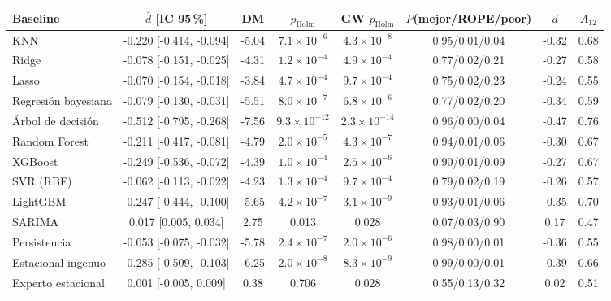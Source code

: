 \begin{tabular}{lccccccc}
\toprule
Baseline & $\bar d$ [IC 95\,\%] & DM & $p_{\mathrm{Holm}}$ & GW $p_{\mathrm{Holm}}$ & $P$(mejor/ROPE/peor) & $d$ & $A_{12}$ \\
\midrule
KNN & -0.220 [-0.414, -0.094] & -5.04 & $7.1\times10^{-6}$ & $4.3\times10^{-8}$ & 0.95/0.01/0.04 & -0.32 & 0.68 \\
Ridge & -0.078 [-0.151, -0.025] & -4.31 & $1.2\times10^{-4}$ & $4.9\times10^{-4}$ & 0.77/0.02/0.21 & -0.27 & 0.58 \\
Lasso & -0.070 [-0.154, -0.018] & -3.84 & $4.7\times10^{-4}$ & $9.7\times10^{-4}$ & 0.75/0.02/0.23 & -0.24 & 0.55 \\
Regresión bayesiana & -0.079 [-0.130, -0.031] & -5.51 & $8.0\times10^{-7}$ & $6.8\times10^{-6}$ & 0.77/0.02/0.20 & -0.34 & 0.59 \\
Árbol de decisión & -0.512 [-0.795, -0.268] & -7.56 & $9.3\times10^{-12}$ & $2.3\times10^{-14}$ & 0.96/0.00/0.04 & -0.47 & 0.76 \\
Random Forest & -0.211 [-0.417, -0.081] & -4.79 & $2.0\times10^{-5}$ & $4.3\times10^{-7}$ & 0.94/0.01/0.06 & -0.30 & 0.67 \\
XGBoost & -0.249 [-0.536, -0.072] & -4.39 & $1.0\times10^{-4}$ & $2.5\times10^{-6}$ & 0.90/0.01/0.09 & -0.27 & 0.67 \\
SVR (RBF) & -0.062 [-0.113, -0.022] & -4.23 & $1.3\times10^{-4}$ & $9.7\times10^{-4}$ & 0.79/0.02/0.19 & -0.26 & 0.57 \\
LightGBM & -0.247 [-0.444, -0.100] & -5.65 & $4.2\times10^{-7}$ & $3.1\times10^{-9}$ & 0.93/0.01/0.06 & -0.35 & 0.70 \\
SARIMA & 0.017 [0.005, 0.034] & 2.75 & 0.013 & 0.028 & 0.07/0.03/0.90 & 0.17 & 0.47 \\
Persistencia & -0.053 [-0.075, -0.032] & -5.78 & $2.4\times10^{-7}$ & $2.0\times10^{-6}$ & 0.98/0.00/0.01 & -0.36 & 0.55 \\
Estacional ingenuo & -0.285 [-0.509, -0.103] & -6.25 & $2.0\times10^{-8}$ & $8.3\times10^{-9}$ & 0.99/0.00/0.01 & -0.39 & 0.66 \\
Experto estacional & 0.001 [-0.005, 0.009] & 0.38 & 0.706 & 0.028 & 0.55/0.13/0.32 & 0.02 & 0.51 \\
\bottomrule
\end{tabular}